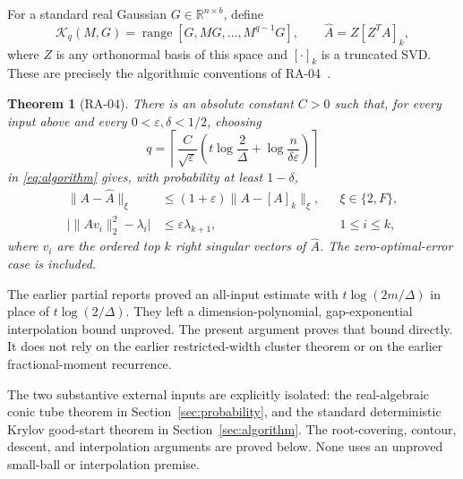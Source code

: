 \documentclass[11pt]{article}
\numberwithin{equation}{section}
\newtheorem{theorem}{Theorem}[section]
\theoremstyle{definition}
\newcommand{\R}{\mathbb R}
\newcommand{\K}{\mathcal K}
\newcommand{\range}{\operatorname{range}}
\newcommand{\nn}[1]{\lVert #1\rVert}
\newcommand{\ahat}{\widehat A}
\begin{document}
For a standard real Gaussian $G\in\R^{n\times b}$, define
\begin{equation}\label{eq:algorithm}
\K_q(M,G)=\range[G,MG,\ldots,M^{q-1}G],\qquad
\ahat=Z[Z^TA]_k,
\end{equation}
where $Z$ is any orthonormal basis of this space and $[\cdot]_k$ is a truncated SVD. These are precisely the algorithmic conventions of RA-04~\cite{repo}.

\begin{theorem}[RA-04]\label{thm:main}
There is an absolute constant $C>0$ such that, for every input above and every
$0<\varepsilon,\delta<1/2$, choosing
\begin{equation}\label{eq:target}
q=\left\lceil\frac{C}{\sqrt\varepsilon}
\left(t\log\frac2\Delta+\log\frac{n}{\delta\varepsilon}\right)\right\rceil
\end{equation}
in \eqref{eq:algorithm} gives, with probability at least $1-\delta$,
\begin{align}
\nn{A-\ahat}_\xi&\le(1+\varepsilon)\nn{A-[A]_k}_\xi,
&&\xi\in\{2,F\},\label{eq:errors}\\
\big|\nn{Av_i}_2^2-\lambda_i\big|&\le\varepsilon\lambda_{k+1},
&&1\le i\le k,\label{eq:right}
\end{align}
where $v_i$ are the ordered top $k$ \emph{right} singular vectors of $\ahat$.
The zero-optimal-error case is included.
\end{theorem}

The earlier partial reports proved an all-input estimate with $t\log(2m/\Delta)$ in place of $t\log(2/\Delta)$. They left a dimension-polynomial, gap-exponential interpolation bound unproved. The present argument proves that bound directly. It does not rely on the earlier restricted-width cluster theorem or on the earlier fractional-moment recurrence.

The two substantive external inputs are explicitly isolated: the real-algebraic conic tube theorem in Section~\ref{sec:probability}, and the standard deterministic Krylov good-start theorem in Section~\ref{sec:algorithm}. The root-covering, contour, descent, and interpolation arguments are proved below. None uses an unproved small-ball or interpolation premise.
\end{document}
